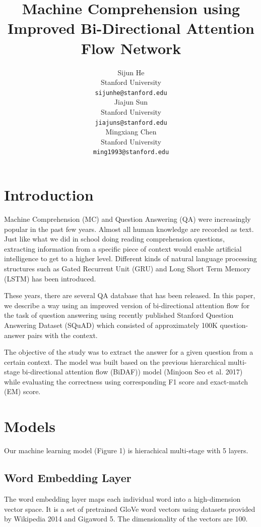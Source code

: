 \documentclass{article} %
\title{Machine Comprehension using Improved Bi-Directional Attention Flow Network}
\author{
Sijun He \\
Stanford University \\
\texttt{sijunhe@stanford.edu} \\
\And
Jiajun Sun \\
Stanford University \\
\texttt{jiajuns@stanford.edu} \\
\And
Mingxiang Chen \\
Stanford University \\
\texttt{ming1993@stanford.edu} \\
}
\begin{document}
\maketitle

\begin{abstract}

\end{abstract}

\section{Introduction}
\label{introduction}

Machine Comprehension (MC) and Question Answering (QA) were increasingly popular in the past few years. Almost all human knowledge are recorded as text. Just like what we did in school doing reading comprehension questions, extracting information from a specific piece of context would enable artificial intelligence to get to a higher level. Different kinds of natural language processing structures such as Gated Recurrent Unit (GRU) and Long Short Term Memory (LSTM) has been introduced.

These years, there are several QA database that has been released. In this paper, we describe a way using an improved version of bi-directional attention flow for the task of question answering using recently published Stanford Question Answering Dataset (SQuAD) which consisted of approximately 100K question-answer pairs with the context.

The objective of the study was to extract the answer for a given question from a certain context. The model was built based on the previous hierarchical multi-stage bi-directional attention flow (BiDAF)) model (Minjoon Seo et al. 2017) while evaluating the correctness using corresponding F1 score and exact-match (EM) score.

\section{Models}
\label{models}

Our machine learning model (Figure 1) is hierachical multi-stage with 5 layers.

\subsection{Word Embedding Layer}

The word embedding layer maps each individual word into a high-dimension vector space. It is a set of pretrained GloVe word vectors using datasets provided by Wikipedia 2014 and Gigaword 5. The dimensionality of the vectors are 100.
\end{document}
